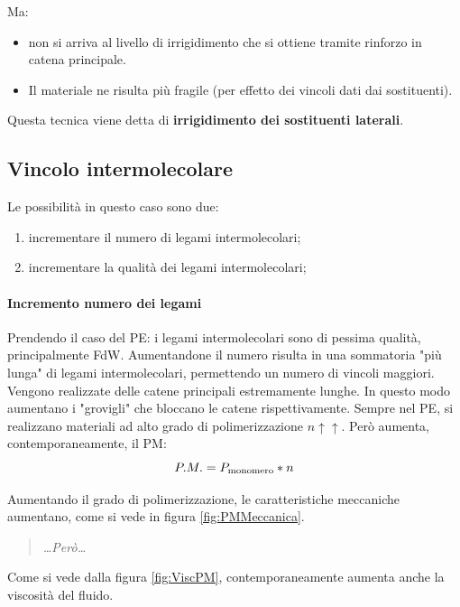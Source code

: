 Ma:
\begin{itemize}
\item non si arriva al livello di irrigidimento che si ottiene tramite rinforzo in catena principale.
\item Il materiale ne risulta più fragile (per effetto dei vincoli dati dai sostituenti).
\end{itemize}
Questa tecnica viene detta di \textbf{irrigidimento dei sostituenti laterali}.

\subsection{Vincolo intermolecolare}
Le possibilità in questo caso sono due:
\begin{enumerate}
\item incrementare il numero di legami intermolecolari;
\item incrementare la qualità dei legami intermolecolari;
\end{enumerate}

\paragraph{Incremento numero dei legami}
Prendendo il caso del \ac{PE}: i legami intermolecolari sono di pessima qualità, principalmente \ac{FdW}. Aumentandone il numero risulta in una sommatoria "più lunga" di legami intermolecolari, permettendo un numero di vincoli maggiori.
Vengono realizzate delle catene principali estremamente lunghe.
In questo modo aumentano i "grovigli" che bloccano le catene rispettivamente.
Sempre nel \ac{PE}, si realizzano materiali ad alto grado di polimerizzazione $n \uparrow\uparrow$.
Però aumenta, contemporaneamente, il \ac{PM}:
\begin{equation}
P.M. = P_{\textup{monomero}} * n
\end{equation}

Aumentando il grado di polimerizzazione, le caratteristiche meccaniche aumentano, come si vede in figura \ref{fig:PMMeccanica}.
\begin{quote}
\emph{\dots Però\dots}
\end{quote}

Come si vede dalla figura \ref{fig:ViscPM}, contemporaneamente aumenta anche la viscosità del fluido.

